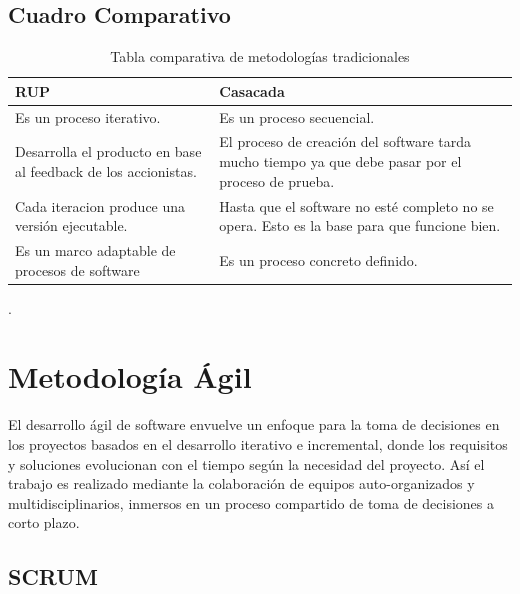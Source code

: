 


\subsection{Cuadro Comparativo}

\begin{table}[H]	
\begin{center}
\begin{tabular}{ | m{6cm} | m{6cm} | } 
  \hline
 RUP & Casacada \\
 \hline
 Es un proceso iterativo.  & Es un proceso secuencial.  \\
 \hline
 Desarrolla el producto en base al feedback de los accionistas.  &   El proceso de creación del software tarda mucho tiempo ya que debe pasar por el proceso de prueba. \\
 \hline
  Cada iteracion produce una versión ejecutable. & Hasta que el software no esté completo no se opera. Esto es la base para que funcione bien. \\
 \hline
  Es un marco adaptable de procesos de software & Es un proceso concreto definido. \\
 \hline
\end{tabular}
\caption{Tabla comparativa de metodologías tradicionales}
\label{Tabla:1}
\end{center}
\end{table}	
.


\section{Metodología Ágil} 

El desarrollo ágil de software envuelve un enfoque para la toma de decisiones en los proyectos basados en el desarrollo iterativo e incremental, donde los requisitos y soluciones evolucionan con el tiempo según la necesidad del proyecto. Así el trabajo es realizado mediante la colaboración de equipos auto-organizados y multidisciplinarios, inmersos en un proceso compartido de toma de decisiones a corto plazo.


\subsection{SCRUM}
